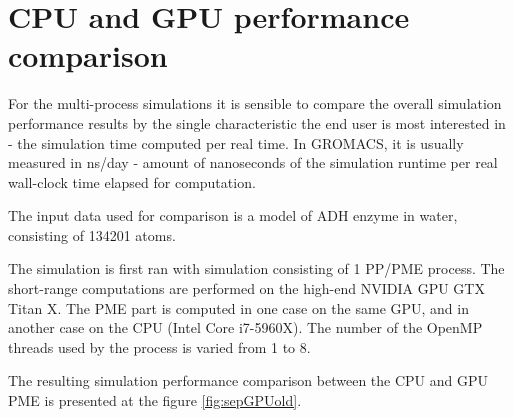 \documentclass[12pt,a4paper]{report}
\begin{document}
\FloatBarrier

\section{CPU and GPU performance comparison}

For the multi-process simulations it is sensible to compare the overall simulation performance results by the single characteristic the end user is most interested in - the simulation time computed per real time. In GROMACS, it is usually measured in ns/day - amount of nanoseconds of the simulation runtime per real wall-clock time elapsed for computation.

The input data used for comparison is a model of ADH enzyme in water, consisting of 134201 atoms.

The simulation is first ran with simulation consisting of 1 PP/PME process. The short-range computations are performed on the high-end NVIDIA GPU GTX Titan X.    
The PME part is computed in one case on the same GPU, and in another case on the CPU (Intel Core i7-5960X). The number of the OpenMP threads used by the process is varied from 1 to 8.
 
The resulting simulation performance comparison between the CPU and GPU PME is presented at the figure \ref{fig:sepGPUold}.
 
\end{document}
